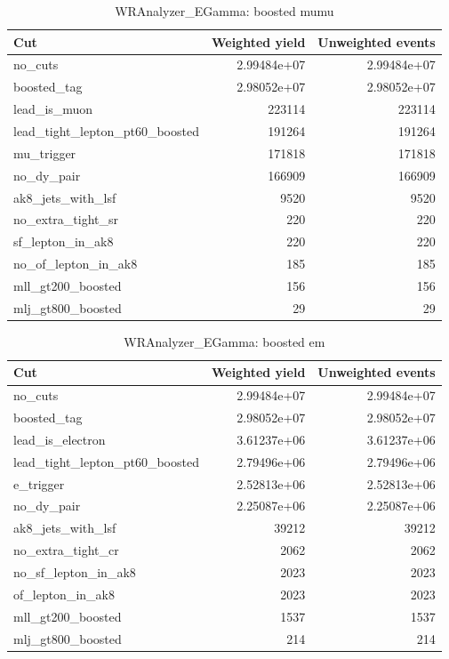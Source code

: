 \documentclass{article}
\begin{document}
\begin{table}[htbp]
\centering
\caption{WRAnalyzer\_EGamma: boosted mumu}
\begin{tabular}{lrr}
\hline
Cut & Weighted yield & Unweighted events \\
\hline
no\_cuts & 2.99484e+07 & 2.99484e+07 \\
boosted\_tag & 2.98052e+07 & 2.98052e+07 \\
lead\_is\_muon & 223114 & 223114 \\
lead\_tight\_lepton\_pt60\_boosted & 191264 & 191264 \\
mu\_trigger & 171818 & 171818 \\
no\_dy\_pair & 166909 & 166909 \\
ak8\_jets\_with\_lsf & 9520 & 9520 \\
no\_extra\_tight\_sr & 220 & 220 \\
sf\_lepton\_in\_ak8 & 220 & 220 \\
no\_of\_lepton\_in\_ak8 & 185 & 185 \\
mll\_gt200\_boosted & 156 & 156 \\
mlj\_gt800\_boosted & 29 & 29 \\
\hline
\end{tabular}
\end{table}

\begin{table}[htbp]
\centering
\caption{WRAnalyzer\_EGamma: boosted em}
\begin{tabular}{lrr}
\hline
Cut & Weighted yield & Unweighted events \\
\hline
no\_cuts & 2.99484e+07 & 2.99484e+07 \\
boosted\_tag & 2.98052e+07 & 2.98052e+07 \\
lead\_is\_electron & 3.61237e+06 & 3.61237e+06 \\
lead\_tight\_lepton\_pt60\_boosted & 2.79496e+06 & 2.79496e+06 \\
e\_trigger & 2.52813e+06 & 2.52813e+06 \\
no\_dy\_pair & 2.25087e+06 & 2.25087e+06 \\
ak8\_jets\_with\_lsf & 39212 & 39212 \\
no\_extra\_tight\_cr & 2062 & 2062 \\
no\_sf\_lepton\_in\_ak8 & 2023 & 2023 \\
of\_lepton\_in\_ak8 & 2023 & 2023 \\
mll\_gt200\_boosted & 1537 & 1537 \\
mlj\_gt800\_boosted & 214 & 214 \\
\hline
\end{tabular}
\end{table}
\end{document}
